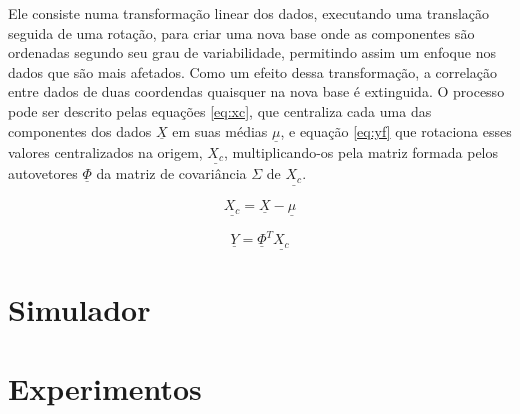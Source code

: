 \documentclass[journal]{IEEEtran}
\begin{document}
Ele consiste numa transformação linear dos dados, executando uma
translação seguida de uma rotação, para criar uma nova base onde as
componentes são ordenadas segundo seu grau de variabilidade, permitindo
assim um enfoque nos dados que são mais afetados. Como um efeito dessa
transformação, a correlação entre dados de duas coordendas quaisquer
na nova base é extinguida. O processo pode ser descrito pelas
equações \ref{eq:xc}, que centraliza cada uma das componentes dos
dados $\underline{X}$ em suas médias $\underline{\mu}$, e equação
\ref{eq:yf} que rotaciona esses valores centralizados na origem,
$\underline{X_{c}}$, multiplicando-os pela matriz formada pelos
autovetores $\underline{\Phi}$ da matriz de covariância $\Sigma$
de $\underline{X_{c}}$.

\begin{equation}
	\underline{X_{c}} = \underline{X} - \underline{\mu}
	\label{eq:xc}
\end{equation}
	
\begin{equation}
	\underline{Y} = \underline{\Phi}^{T} \underline{X_{c}}
	\label{eq:yf}
\end{equation}

\vspace{3mm}
\section{Simulador}
\blindtext



\section{Experimentos}
\blindtext
\end{document}
